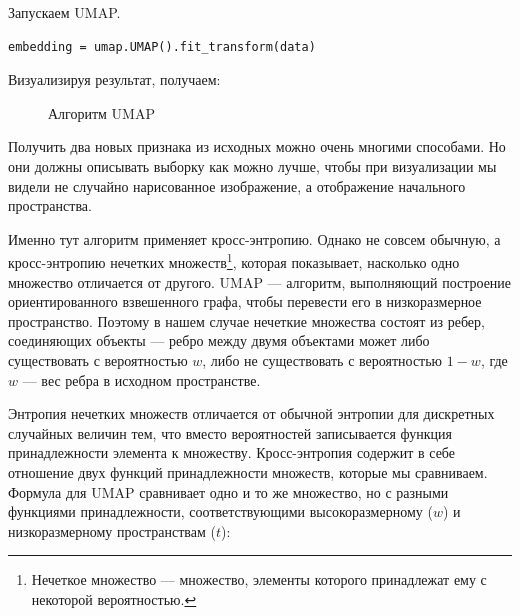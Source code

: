 Запускаем UMAP.
\begin{verbatim}
embedding = umap.UMAP().fit_transform(data)
\end{verbatim}

Визуализируя результат, получаем:

\begin{figure}[bh]
	\noindent{}
	\caption{Алгоритм UMAP}
	\label{figCurves}
\end{figure} 

Получить два новых признака из исходных можно очень многими способами. Но они должны описывать выборку как можно лучше, чтобы при визуализации мы видели не случайно нарисованное изображение, а отображение начального пространства.

Именно тут алгоритм применяет кросс-энтропию. Однако не совсем обычную, а кросс-энтропию нечетких множеств\footnote{Нечеткое множество --- множество, элементы которого принадлежат ему с некоторой вероятностью.}, которая показывает, насколько одно множество отличается от другого. UMAP --- алгоритм, выполняющий построение ориентированного взвешенного графа, чтобы перевести его в низкоразмерное пространство. Поэтому в нашем случае нечеткие множества состоят из ребер, соединяющих объекты --- ребро между двумя объектами может либо существовать с вероятностью $w$, либо не существовать с вероятностью $1-w$, где $w$ --- вес ребра в исходном пространстве.

Энтропия нечетких множеств отличается от обычной энтропии для дискретных случайных величин тем, что вместо вероятностей записывается функция принадлежности элемента к множеству. Кросс-энтропия содержит в себе отношение двух функций принадлежности множеств, которые мы сравниваем. Формула для UMAP сравнивает одно и то же множество, но с разными функциями принадлежности, соответствующими высокоразмерному ($w$) и низкоразмерному пространствам ($t$):

